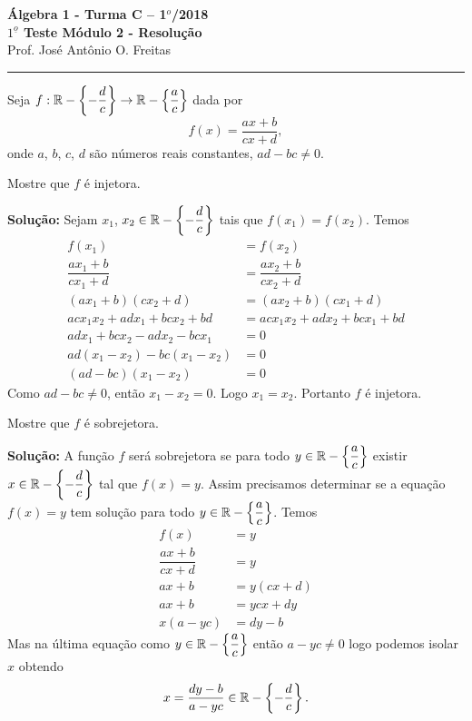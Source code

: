 \documentclass[12pt]{article}
\begin{document}


\begin{center}
{\Large\bf {\'A}lgebra 1 - Turma C -- 1$^{o}$/2018} \\ \vspace{9pt} {\large\bf
  $1^{\underline{o}}$ Teste Módulo 2 - Resolu\c{c}\~ao}\\
\vspace{9pt} Prof. Jos{\'e} Ant{\^o}nio O. Freitas
\end{center}
\hrule

\vspace{.6cm}

Seja $f : \mathbb{R} - \left\{-\dfrac{d}{c}\right\} \to \mathbb{R} - \left\{\dfrac{a}{c}\right\}$ dada por
\[
	f(x) =  \dfrac{ax + b}{cx + d},
\]
onde $a$, $b$, $c$, $d$ s{\~a}o n{\'u}meros reais constantes, $ad - bc \ne 0$.
\vspace{.5cm}

\questao Mostre que $f$ é injetora.

\noindent\textbf{Solu\c{c}\~ao:} Sejam $x_1$, $x_2 \in \mathbb{R} - \left\{-\dfrac{d}{c}\right\}$ tais que $f(x_1) = f(x_2)$. Temos
\begin{align*}
	f(x_1) &= f(x_2)\\
	\dfrac{ax_1 + b}{cx_1 + d} &= \dfrac{ax_2 + b}{cx_2 + d}\\
	(ax_1 + b)(cx_2 + d) &= (ax_2 + b)(cx_1 + d)\\
	acx_1x_2 + adx_1 + bcx_2 + bd &= acx_1x_2 + adx_2 + bcx_1 + bd\\
	adx_1 + bcx_2 - adx_2 - bcx_1 &= 0\\
	ad(x_1 - x_2) - bc(x_1 - x_2)&= 0\\
	(ad - bc)(x_1 - x_2) &= 0
\end{align*}
Como $ad - bc \ne 0$, então $x_1 - x_2 = 0$. Logo $x_1 = x_2$. Portanto $f$ é injetora.

\vspace{.5cm}

\questao Mostre que $f$ é sobrejetora.

\noindent\textbf{Solu\c{c}\~ao:} A função $f$ será sobrejetora se para todo $y \in \mathbb{R} - \left\{\dfrac{a}{c}\right\}$ existir $x \in \mathbb{R} - \left\{-\dfrac{d}{c}\right\}$ tal que $f(x) = y$. Assim precisamos determinar se a equação $f(x) = y$ tem solução para todo $y \in \mathbb{R} - \left\{\dfrac{a}{c}\right\}$.
Temos
\begin{align*}
	f(x) &= y\\
	\dfrac{ax + b}{cx + d} &= y\\
	ax + b &= y(cx + d)\\
	ax + b &= ycx + dy\\
	x(a - yc) &= dy - b
\end{align*}
Mas na última equação como $y \in \mathbb{R} - \left\{\dfrac{a}{c}\right\}$ então $a - yc \ne 0$ logo podemos isolar $x$ obtendo
\[
	x = \dfrac{dy - b}{a - yc} \in \mathbb{R} - \left\{-\dfrac{d}{c}\right\}.
\]
\end{document}
